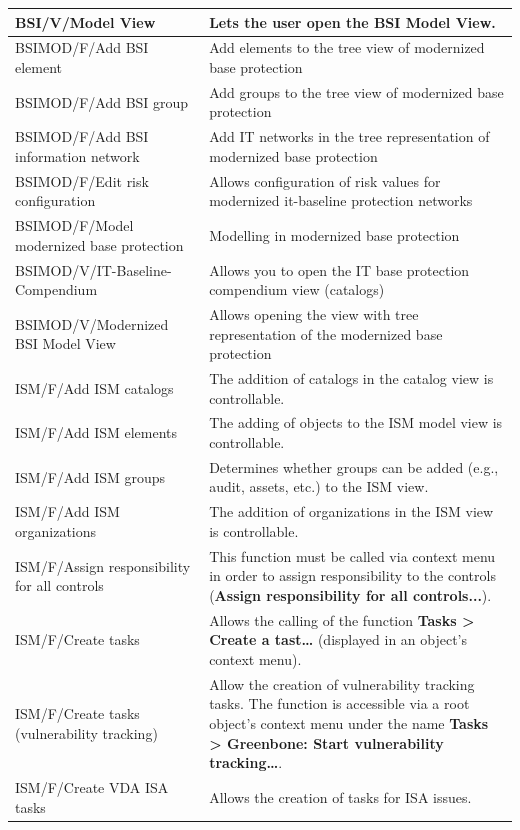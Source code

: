 \documentclass[a4paper,10pt]{book}
\begin{document}
\begin{longtable}{| p{5cm} | p{6cm} |}
BSI/V/Model View & Lets the user open the BSI Model View. \\[10pt] \hline
BSIMOD/F/Add BSI element & Add elements to the tree view of modernized base protection \\[10pt] \hline
BSIMOD/F/Add BSI group & Add groups to the tree view of modernized base protection \\[10pt] \hline
BSIMOD/F/Add BSI information network & Add IT networks in the tree representation of modernized base protection \\[10pt] \hline
BSIMOD/F/Edit risk configuration & Allows configuration of risk values for modernized it-baseline protection networks \\[10pt] \hline
BSIMOD/F/Model modernized base protection & Modelling in modernized base protection \\[10pt] \hline
BSIMOD/V/IT-Baseline-Compendium & Allows you to open the IT base protection compendium view (catalogs) \\[10pt] \hline
BSIMOD/V/Modernized BSI Model View & Allows opening the view with tree representation of the modernized base protection \\[10pt] \hline
ISM/F/Add ISM catalogs & The addition of catalogs in the catalog view is
controllable. \\[10pt] \hline
ISM/F/Add ISM elements & The adding of objects to the ISM model view is
controllable. \\[10pt] \hline
ISM/F/Add ISM groups & Determines whether groups can be added (e.g., audit,
assets, etc.) to the ISM view. \\[10pt] \hline
ISM/F/Add ISM organizations & The addition of organizations in the ISM view is
controllable. \\[10pt] \hline
ISM/F/Assign responsibility for all controls & This function must be called via
context menu in order to assign responsibility to the controls (\textbf{Assign
responsibility for all controls...}). \\[10pt] \hline
ISM/F/Create tasks & Allows the calling of the function \textbf{Tasks > Create
a tast…} (displayed in an object's context menu). \\[10pt] \hline
ISM/F/Create tasks (vulnerability tracking) & Allow the creation of
vulnerability tracking tasks. The function is accessible via a root object's
context menu under the name \textbf{Tasks > Greenbone: Start vulnerability
tracking…}. \\[10pt] \hline
ISM/F/Create VDA ISA tasks & Allows the creation of tasks for ISA issues.

\end{longtable}
\end{document}
